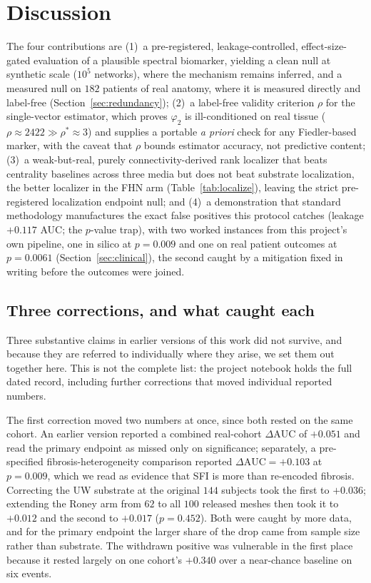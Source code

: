 \documentclass[11pt]{article}
\theoremstyle{definition}
\newcommand{\phii}{\varphi}
\newcommand{\rhoval}{\rho}
\newcommand{\dAUC}{\Delta\mathrm{AUC}}
\begin{document}
\section{Discussion}
The four contributions are (1)~a pre-registered, leakage-controlled,
effect-size-gated evaluation of a plausible spectral biomarker, yielding a clean
null at synthetic scale ($10^5$ networks), where the mechanism remains inferred,
and a measured null on $182$ patients of real anatomy, where it is measured
directly and label-free (Section~\ref{sec:redundancy}); (2)~a label-free
validity criterion $\rhoval$ for the single-vector estimator, which proves
$\phii_2$ is ill-conditioned on real tissue ($\rhoval\approx2422\gg
\rhoval^\ast\approx3$) and supplies a portable \emph{a priori} check for any
Fiedler-based marker, with the caveat that $\rhoval$ bounds estimator accuracy,
not predictive content; (3)~a weak-but-real, purely connectivity-derived rank
localizer that beats centrality baselines across three media but does not beat
substrate localization, the better localizer in the FHN arm
(Table~\ref{tab:localize}), leaving the strict pre-registered localization
endpoint null; and (4)~a demonstration that standard methodology manufactures
the exact false positives this protocol catches (leakage $+0.117$ AUC; the
$p$-value trap), with two worked instances from this project's own pipeline, one
in silico at $p=0.009$ and one on real patient outcomes at $p=0.0061$
(Section~\ref{sec:clinical}), the second caught by a mitigation fixed in writing
before the outcomes were joined.

\subsection{Three corrections, and what caught each}
\label{sec:corrections}

Three substantive claims in earlier versions of this work did not survive, and
because they are referred to individually where they arise, we set them out
together here. This is not the complete list: the project notebook holds the
full dated record, including further corrections that moved individual reported
numbers.

The first correction moved two numbers at once, since both rested on the same
cohort. An earlier version reported a combined real-cohort $\dAUC$ of $+0.051$
and read the primary endpoint as missed only on significance; separately, a
pre-specified fibrosis-heterogeneity comparison reported $\dAUC=+0.103$ at
$p=0.009$, which we read as evidence that SFI is more than re-encoded fibrosis.
Correcting the UW substrate at the original $144$ subjects took the first to
$+0.036$; extending the Roney arm from $62$ to all $100$ released meshes then
took it to $+0.012$ and the second to $+0.017$ ($p=0.452$). Both were caught by
more data, and for the primary endpoint the larger share of the drop came from
sample size rather than substrate. The withdrawn positive was vulnerable in the
first place because it rested largely on one cohort's $+0.340$ over a near-chance
baseline on six events.
\end{document}
